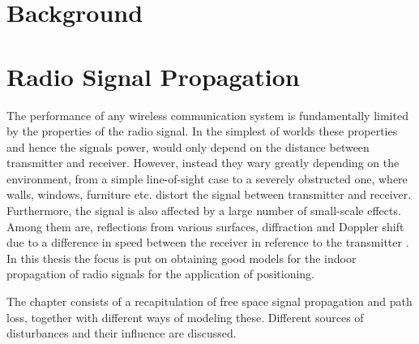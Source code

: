 \documentclass{LTHthesis}
\begin{document}
\chapter{Background}

\chapter{Radio Signal Propagation}
%
\label{chap:RSP}
%
The performance of any wireless communication system is fundamentally limited by the properties of the radio signal. In the simplest of worlds these properties and hence the signals power, would only depend on the distance between transmitter and receiver. However, instead they wary greatly depending on the environment, from a simple line-of-sight case to a severely obstructed one, where walls, windows, furniture etc. distort the signal between transmitter and receiver. Furthermore, the signal is also affected by a large number of small-scale effects. Among them are, reflections from various surfaces, diffraction and Doppler shift due to a difference in speed between the receiver in reference to the transmitter \cite{rappaport96}. In this thesis the focus is put on obtaining good models for the indoor propagation of radio signals for the application of positioning. 

The chapter consists of a recapitulation of free space signal propagation and path loss, together with different ways of modeling these. Different sources of disturbances and their influence are discussed. 
%
\end{document}
